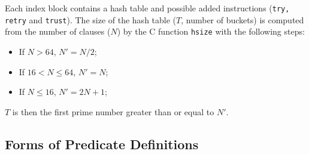 \documentclass[11pt]{article}
\begin{document}
Each index block contains a hash table and possible added instructions
({\tt try, retry} and {\tt trust}). The size of the hash table
($T$, number of buckets) is computed from the number of clauses ($N$) by the C
function {\tt hsize} with the following steps:

\begin{itemize}
  \item If $N>64$, $N' = N/2$;
  \item If $16 < N \leq 64$, $N' = N$;
  \item If $N \leq 16$, $N' = 2N+1$;
\end{itemize}

$T$ is then the first prime number greater than or equal to $N'$.


\subsection{Forms of Predicate Definitions}
\end{document}
